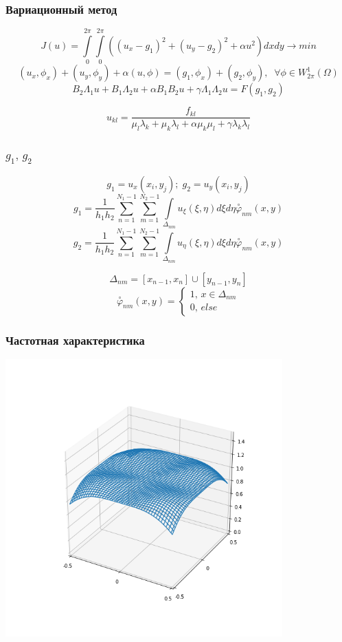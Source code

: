 \documentclass{beamer}
\begin{document}
\begin{frame}
\frametitle{Вариационный метод}
 $$J(u) = \int \limits_0^{2\pi} \int \limits_0^{2\pi} ((u_x - g_1)^2 + (u_y-g_2)^2 + \alpha u^2 )dxdy \rightarrow min$$
 $$(u_x, \phi_x) + (u_y,\phi_y) + \alpha(u, \phi) = (g_1, \phi_x) + (g_2, \phi_y),\;\;\forall\phi \in W_{2\pi}^{1}(\Omega)$$
 $$B_2 \Lambda_1 u + B_1 \Lambda_2 u + \alpha B_1 B_2 u + \gamma\Lambda_1\Lambda_2u = F(g_1,g_2)$$
 
$$u_{kl} = \frac{f_{kl}}{\mu_l \lambda_k + \mu_k \lambda_l + \alpha \mu_k \mu_l + \gamma \lambda_k \lambda_l}$$
\end{frame}

\begin{frame}
\frametitle{$g_1,\,g_2$}
$$g_1 = u_x(x_i,y_j);\; g_2 = u_y(x_i,y_j)$$
$$
g_1 = \frac{1}{h_1h_2} \sum \limits_{n=1}^{N_1 - 1} \sum \limits_{m=1}^{N_2 - 1} \int \limits _{\Delta_{nm}} u_\xi(\xi,\eta) d\xi d\eta\overset{\circ}{\varphi}_{nm}(x,y)
$$
$$
g_2 = \frac{1}{h_1h_2} \sum \limits_{n=1}^{N_1 - 1} \sum \limits_{m=1}^{N_2 - 1} \int \limits _{\Delta_{nm}} u_\eta(\xi,\eta) d\xi d\eta \overset{\circ}{\varphi}_{nm}(x,y)
$$

$$
\Delta_{nm} = [x_{n-1}, x_n] \cup [y_{n-1}, y_n]
$$
$$
\overset{\circ}{\varphi}_{nm}(x,y) = \begin{cases} 1, \, x \in \Delta_{nm} \\ 0, \, else\end{cases}
$$

\end{frame}

\begin{frame}
\frametitle{Частотная характеристика}
\includegraphics[width=0.8\textwidth]{3dcont.png}
\end{frame}
\end{document}
